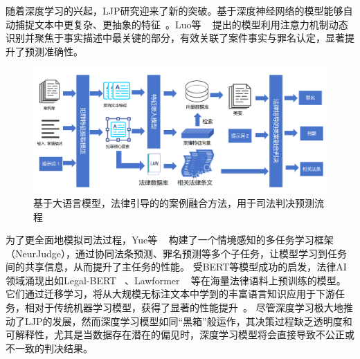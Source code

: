 随着深度学习的兴起，LJP研究迎来了新的突破。基于深度神经网络的模型能够自动捕捉文本中更复杂、更抽象的特征~\cite{cheng2025legal,dong2021legal,feng2022legal,jiang2018interpretable,wang2019hierarchical,Stroudsburg}。Luo等 ~\cite{huang2019improved} 提出的模型利用注意力机制动态识别并聚焦于事实描述中最关键的部分，有效关联了案件事实与罪名认定，显著提升了预测准确性。
\begin{figure}[htpb]
	\centering
	\includegraphics[width=1\textwidth]{fig/method.pdf}
	\caption{基于大语言模型，法律引导的的案例融合方法，用于司法判决预测流程}
	\label{fig:main}
\end{figure}
为了更全面地模拟司法过程，Yue等 ~\cite{yue2021neurjudge} 构建了一个情境感知的多任务学习框架（NeurJudge），通过协同法条预测、罪名预测等多个子任务，让模型学习到任务间的共享信息，从而提升了主任务的性能。
受BERT等模型成功的启发，法律AI领域涌现出如Legal-BERT ~\cite{liu2021robustly,chalkidis2020legal,deepa2021bidirectional,devlin2019bert,fan2022multi}、Lawformer ~\cite{xiao2021lawformer,du2022glm,fei2023lawbench,oana-maria2018e-snli} 等在海量法律语料上预训练的模型。它们通过迁移学习，将从大规模无标注文本中学到的丰富语言知识应用于下游任务，相对于传统机器学习模型，获得了显著的性能提升~\cite{cui2021pre,houlsby2019parameter,hu2018few,zhang2023contrastive}。
尽管深度学习极大地推动了LJP的发展，然而深度学习模型如同“黑箱”般运作，其决策过程缺乏透明度和可解释性，尤其是当数据存在潜在的偏见时，深度学习模型将会直接导致不公正或不一致的判决结果。

